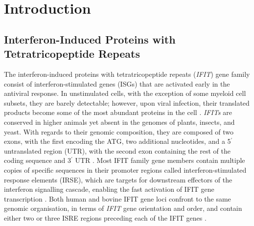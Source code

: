\chapter{Introduction} \label{ch:Introduction}
\section{Interferon-Induced Proteins with Tetratricopeptide Repeats} \label{sec:Interferon-Induced Proteins with Tetratricopeptide Repeats}
The interferon-induced proteins with tetratricopeptide repeats (\textit{IFIT}) gene family consist of interferon-stimulated genes (ISGs) that are activated early in the antiviral response. In unstimulated cells, with the exception of some myeloid cell subsets, they are barely detectable; however, upon viral infection, their translated products become some of the most abundant proteins in the cell \cite{Diamond2013TheProteins}. \textit{IFITs} are conserved in higher animals yet absent in the genomes of plants, insects, and yeast. With regards to their genomic composition, they are composed of two exons, with the first encoding the ATG, two additional nucleotides, and a 5$^{\prime}$ untranslated region (UTR), with the second exon containing the rest of the coding sequence and 3$^{\prime}$ UTR \cite{deVeer1998IFI60/ISG60/IFIT4Genes}. Most IFIT family gene members contain multiple copies of specific sequences in their promoter regions called interferon-stimulated response elements (IRSE), which are targets for downstream effectors of the interferon signalling cascade, enabling the fast activation of IFIT gene transcription \cite{Lou2009IFR-9/STAT2STAT1}. Both human and bovine IFIT gene loci confront to the same genomic organisation, in terms of \textit{IFIT} gene orientation and order, and contain either two or three ISRE regions preceding each of the IFIT genes \cite{Liu2013Lineage-SpecificFamily}.

